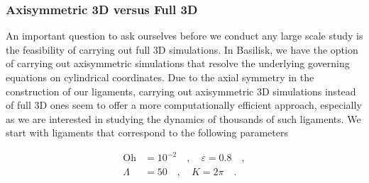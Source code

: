 \subsubsection*{Axisymmetric 3D versus Full 3D}

An important question to ask ourselves before we conduct any large scale
study is the feasibility of carrying out full 3D simulations. 
In Basilisk, we have the option of carrying out axisymmetric simulations
that resolve the underlying governing equations on cylindrical coordinates. 
Due to the axial symmetry in the construction of our ligaments, carrying 
out axisymmetric 3D simulations instead of full 3D ones seem to offer a more 
computationally efficient approach, especially as we are interested in studying
the dynamics of thousands of such ligaments. 
We start with ligaments that correspond to the following parameters

\begin{align}
	\textrm{Oh} &= 10^{-2} \quad, \quad \varepsilon = 0.8 \quad , \\
	\Lambda &= 50 \quad , \quad K = 2\pi \quad .
\label{base_params}
\end{align}


